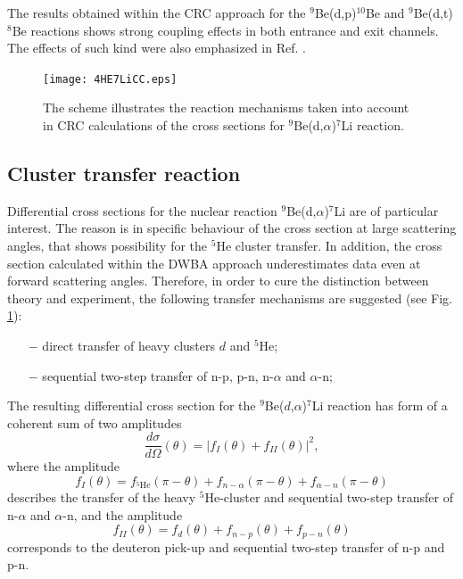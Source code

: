 \documentclass[10pt]{iopart}
\begin{document}
The results obtained within the CRC approach for the ${}^9$Be(d,p)${}^{10}$Be and ${}^9$Be(d,t)${}^{8}$Be reactions shows strong coupling effects in both entrance and exit channels. The effects of such kind were also emphasized in Ref. \cite{harakeh1980, rudchik2016}.

\begin{figure}[tp]
\centering
\texttt{[image: 4HE7LiCC.eps]}
\caption{\label{4He7LICC} The scheme illustrates the reaction mechanisms taken into account in CRC calculations of the cross sections for ${}^9$Be(d,$\alpha$)${}^7$Li reaction.}
\end{figure}	

\subsection{Cluster transfer reaction}
Differential cross sections for the nuclear reaction ${^9}$Be(d,$\alpha$)${}^7$Li are of particular interest. The reason is in specific behaviour of the cross section at large scattering angles, that shows possibility for the ${}^5$He cluster transfer. In addition, the cross section calculated within the DWBA approach underestimates data even at forward scattering angles. Therefore, in order to cure the distinction between theory and experiment, the following transfer mechanisms are suggested (see Fig. \ref{4He7LICC}):
\begin{itemize}
\item[$-$] direct transfer of heavy clusters $d$ and ${}^5$He;
\item[$-$] sequential two-step transfer of n-p, p-n, n-$\alpha$ and $\alpha$-n;
\end{itemize}

The resulting differential cross section for the ${^9}$Be($d$,$\alpha$)${}^7$Li reaction has form of a coherent sum of two amplitudes
\begin{equation}
\frac{d\sigma}{d\Omega}(\theta) =\vert f_{I}(\theta) + f_{II}(\theta) \vert ^2,
\end{equation}
where the amplitude
\begin{equation} \label{eq:ampl1}
f_{I}(\theta)=f_{{}^5\textrm{He}}(\pi - \theta) + f_{n-\alpha}(\pi - \theta) + f_{\alpha-n}(\pi - \theta)
\end{equation}
describes the transfer of the heavy ${}^5$He-cluster and sequential two-step transfer of n-$\alpha$ and $\alpha$-n, and the amplitude
\begin{equation} \label{eq:ampl2}
f_{II}(\theta)=f_{d}(\theta) + f_{n-p}( \theta) + f_{p-n}(\theta)
\end{equation}
corresponds to the deuteron pick-up and sequential two-step transfer of n-p and p-n.
\end{document}
